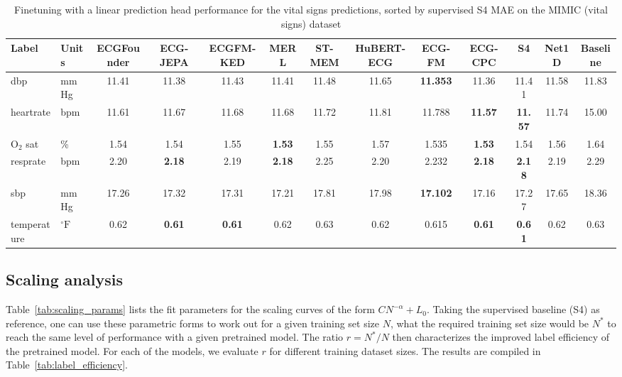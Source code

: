 \documentclass{article}
\begin{document}
                \begin{table}[htbp]
                    \centering
                    \tiny
                    \setlength{\tabcolsep}{2pt}
                    \caption{Finetuning with a linear prediction head performance for the vital signs predictions, sorted by supervised S4 MAE on the MIMIC (vital signs) dataset}
                    \begin{tabular}{llccccccccccc}
                        \toprule
                        \textbf{Label} & \textbf{Units} & \textbf{ECGFounder} & \textbf{ECG-JEPA} & \textbf{ECGFM-KED} & \textbf{MERL} & \textbf{ST-MEM} & \textbf{HuBERT-ECG} & \textbf{ECG-FM} & \textbf{ECG-CPC} & \textbf{S4} & \textbf{Net1D} & \textbf{Baseline} \\
                        \midrule
                        dbp & mmHg & 11.41 & 11.38 & 11.43 & 11.41 & 11.48 & 11.65 & \textbf{11.353} & 11.36 & 11.41 & 11.58 & 11.83 \\
                        heartrate & bpm & 11.61 & 11.67 & 11.68 & 11.68 & 11.72 & 11.81 & 11.788 & \textbf{11.57} & \textbf{11.57} & 11.74 & 15.00 \\
                        O$_2$ sat & \% & 1.54 & 1.54 & 1.55 & \textbf{1.53} & 1.55 & 1.57 & 1.535 & \textbf{1.53} & 1.54 & 1.56 & 1.64 \\
                        resprate & bpm & 2.20 & \textbf{2.18} & 2.19 & \textbf{2.18} & 2.25 & 2.20 & 2.232 & \textbf{2.18} & \textbf{2.18} & 2.19 & 2.29 \\
                        sbp & mmHg & 17.26 & 17.32 & 17.31 & 17.21 & 17.81 & 17.98 & \textbf{17.102} & 17.16 & 17.27 & 17.65 & 18.36 \\
                        temperature & $^{\circ}\mathrm{F}$ & 0.62 & \textbf{0.61} & \textbf{0.61} & 0.62 & 0.63 & 0.62 & 0.615 & \textbf{0.61} & \textbf{0.61} & 0.62 & 0.63 \\
                        \bottomrule
                    \end{tabular}
                    \label{tab:results_overview_vitals}
                \end{table}
                

        \subsection{Scaling analysis}
        Table~\ref{tab:scaling_params} lists the fit parameters for the scaling curves of the form $C N^{-\alpha}+L_0$. Taking the supervised baseline (S4) as reference, one can use these parametric forms to work out for a given training set size $N$, what the required training set size would be $N^*$ to reach the same level of performance with a given pretrained model. The ratio $r=N^*/N$ then characterizes the improved label efficiency of the pretrained model. For each of the models, we evaluate $r$ for different training dataset sizes. The results are compiled in Table~\ref{tab:label_efficiency}.
\end{document}
